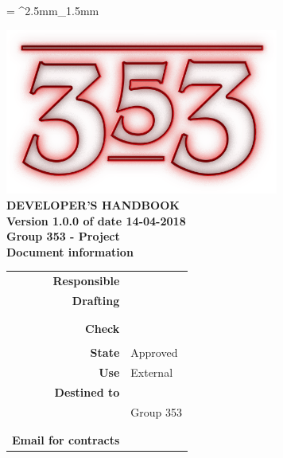 \documentclass[openany, a4paper, 12pt]{report}
\begin{document}
	
	\tabulinesep = ^2.5mm_1.5mm
	
	\begin{titlepage}
		\centering
		\vfill
		{
			\bfseries
			\vskip2cm
			\includegraphics[width=9cm]{../../common/images/logo.png} \\
			\vfill
			\Huge{DEVELOPER'S HANDBOOK}\\
			\vfill
			\Large Version 1.0.0 of date 14-04-2018\\ 
			\large Group 353 - Project \progetto \\
			\vfill
			\normalsize Document information\\
			\begin{table}[htbp]
				\centering
				\renewcommand\arraystretch{1.2}
				\begin{tabular}{r|l}
					\hline
					\textbf{Responsible}	& \Parwinder \\
					
					\textbf{Drafting} 		& \Elena \\
											& \Gianluca \\
											& \Valentina \\
											
					\textbf{Check} 			& \Riccardo \\	
											& \Davide \\
											
					\textbf{State} 			& Approved\\
					\textbf{Use}			& External\\
					\textbf{Destined to}   	& \Proponente\\
										& Group 353\\
										& \Vardanega\\
										& \Cardin\\
					
					\textbf{Email for contracts}	& \mailgroup
				\end{tabular}
			\end{table}
			\vfill
		}    
	\end{titlepage}
	
	\renewcommand{\contentsname}{Index}
	\tableofcontents
	\renewcommand{\listfigurename}{List of Figures}
	\listoffigures
	\newpage
	
	
	
	
	
	
	
	
	
	
\end{document}
